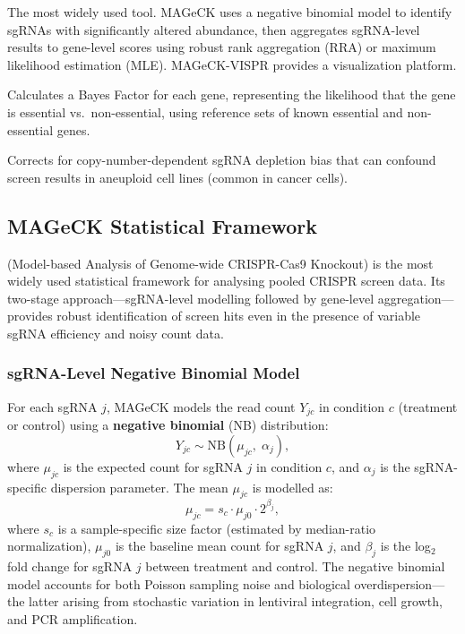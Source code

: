 \begin{description}[style=nextline, itemsep=2pt]
  \item[\software{MAGeCK} (Model-based Analysis of Genome-wide CRISPR-Cas9 Knockout)] The most widely used tool. MAGeCK uses a negative binomial model to identify sgRNAs with significantly altered abundance, then aggregates sgRNA-level results to gene-level scores using robust rank aggregation (RRA) or maximum likelihood estimation (MLE). MAGeCK-VISPR provides a visualization platform.

  \item[\software{BAGEL2} (Bayesian Analysis of Gene Essentiality with Location)] Calculates a Bayes Factor for each gene, representing the likelihood that the gene is essential vs.\ non-essential, using reference sets of known essential and non-essential genes.

  \item[\software{CRISPRcleanR}] Corrects for copy-number-dependent sgRNA depletion bias that can confound screen results in aneuploid cell lines (common in cancer cells).
\end{description}

\subsection{MAGeCK Statistical Framework}
\label{subsec:specialized:mageck-model}

 (Model-based Analysis of Genome-wide CRISPR-Cas9 Knockout) is the most widely used statistical framework for analysing pooled CRISPR screen data. Its two-stage approach---sgRNA-level modelling followed by gene-level aggregation---provides robust identification of screen hits even in the presence of variable sgRNA efficiency and noisy count data.

\subsubsection{sgRNA-Level Negative Binomial Model}

For each sgRNA $j$, MAGeCK models the read count $Y_{jc}$ in condition $c$ (treatment or control) using a \textbf{negative binomial} (NB) distribution:
\begin{equation}
  Y_{jc} \sim \text{NB}(\mu_{jc},\; \alpha_j),
  \label{eq:specialized:mageck-nb}
\end{equation}
where $\mu_{jc}$ is the expected count for sgRNA $j$ in condition $c$, and $\alpha_j$ is the sgRNA-specific dispersion parameter. The mean $\mu_{jc}$ is modelled as:
\begin{equation}
  \mu_{jc} = s_c \cdot \mu_{j0} \cdot 2^{\beta_j},
  \label{eq:specialized:mageck-mean}
\end{equation}
where $s_c$ is a sample-specific size factor (estimated by median-ratio normalization), $\mu_{j0}$ is the baseline mean count for sgRNA $j$, and $\beta_j$ is the log$_2$ fold change for sgRNA $j$ between treatment and control. The negative binomial model accounts for both Poisson sampling noise and biological overdispersion---the latter arising from stochastic variation in lentiviral integration, cell growth, and PCR amplification.

